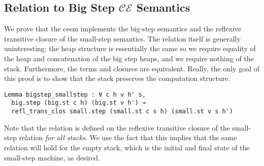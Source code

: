 \subsection{Relation to Big Step $\mathcal{CE}$ Semantics}

We prove that the cesm implements the big-step semantics and the reflexive
transitive closure of the small-step semantics. The relation itself is generally
uninteresting; the heap structure is essentially the same so we require equality
of the heap and concatenation of the big step heaps, and we require nothing of
the stack. Furthermore, the terms and closures are equivalent. Really, the only
goal of this proof is to show that the stack preserves the computation
structure.  

\begin{lstlisting}
Lemma bigstep_smallstep : ∀ c h v h' s, 
  big.step (big.st c h) (big.st v h') → 
  refl_trans_clos small.step (small.st c s h) (small.st v s h')
\end{lstlisting}

Note that the relation is defined on the reflexive transitive closure of the
small-step relation \emph{for all stacks}. We use the fact that this implies
that the same relation will hold for the empty stack, which is the initial and
final state of the small-step machine, as desired.

